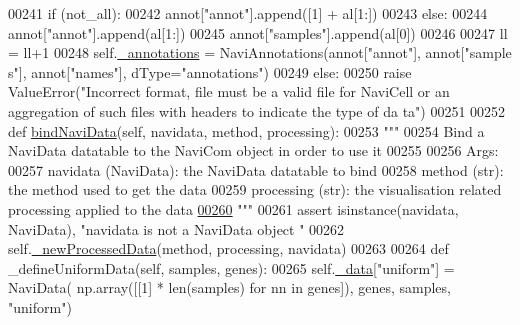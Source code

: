 \begin{DoxyCode}
00241                     \textcolor{keywordflow}{if} (not\_all):
00242                         annot[\textcolor{stringliteral}{"annot"}].append([1] + al[1:])
00243                     \textcolor{keywordflow}{else}:
00244                         annot[\textcolor{stringliteral}{"annot"}].append(al[1:])
00245                     annot[\textcolor{stringliteral}{"samples"}].append(al[0])
00246 
00247                     ll = ll+1
00248                 self.\hyperlink{classnavicom_1_1navicom_1_1NaviCom_afb88722efeb86813dcb85818b7065330}{_annotations} = NaviAnnotations(annot[\textcolor{stringliteral}{"annot"}], annot[\textcolor{stringliteral}{"sample
      s"}], annot[\textcolor{stringliteral}{"names"}], dType=\textcolor{stringliteral}{"annotations"})
00249             \textcolor{keywordflow}{else}:
00250                 \textcolor{keywordflow}{raise} ValueError(\textcolor{stringliteral}{"Incorrect format, file must be a valid file for
       NaviCell or an aggregation of such files with headers to indicate the type of da
      ta"})
00251 
00252     \textcolor{keyword}{def }\hyperlink{classnavicom_1_1navicom_1_1NaviCom_ae310adb1d4e8932f0b72b6d8b6ca6301}{bindNaviData}(self, navidata, method, processing):
00253         \textcolor{stringliteral}{"""}
00254 \textcolor{stringliteral}{        Bind a NaviData datatable to the NaviCom object in order to use it }
00255 \textcolor{stringliteral}{}
00256 \textcolor{stringliteral}{        Args:}
00257 \textcolor{stringliteral}{            navidata (NaviData): the NaviData datatable to bind}
00258 \textcolor{stringliteral}{            method (str): the method used to get the data}
00259 \textcolor{stringliteral}{            processing (str): the visualisation related processing applied to the
       data}
\hypertarget{navicom_8py_source_l00260}{}\hyperlink{classnavicom_1_1navicom_1_1NaviCom_ae310adb1d4e8932f0b72b6d8b6ca6301}{00260} \textcolor{stringliteral}{        """}
00261         \textcolor{keyword}{assert} isinstance(navidata, NaviData), \textcolor{stringliteral}{"navidata is not a NaviData object
      "}
00262         self.\hyperlink{classnavicom_1_1navicom_1_1NaviCom_acf8b9094fa76cafefb910daeb68b7e5d}{_newProcessedData}(method, processing, navidata)
00263 
00264     \textcolor{keyword}{def }\_defineUniformData(self, samples, genes):
00265         self.\hyperlink{classnavicom_1_1navicom_1_1NaviCom_a407b2b5c30a5652ee85c4be54b3e6679}{_data}[\textcolor{stringliteral}{"uniform"}] = NaviData( np.array([[1] * len(samples) \textcolor{keywordflow}{for} nn \textcolor{keywordflow}{in} 
      genes]), genes, samples, \textcolor{stringliteral}{"uniform"})

\end{DoxyCode}
